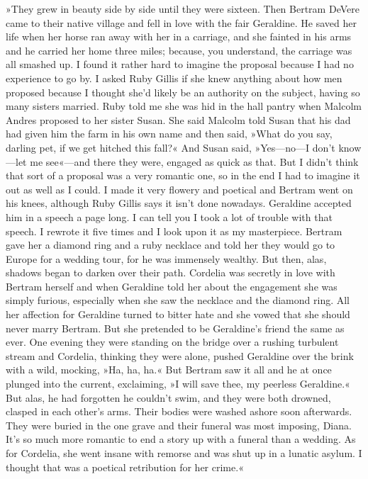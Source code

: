 »They grew in beauty side by side until they were sixteen. Then Bertram DeVere came to their native village and fell in love with the fair Geraldine. He saved her life when her horse ran away with her in a carriage, and she fainted in his arms and he carried her home three miles; because, you understand, the carriage was all smashed up. I found it rather hard to imagine the proposal because I had no experience to go by. I asked Ruby Gillis if she knew anything about how men proposed because I thought she'd likely be an authority on the subject, having so many sisters married. Ruby told me she was hid in the hall pantry when Malcolm Andres proposed to her sister Susan. She said Malcolm told Susan that his dad had given him the farm in his own name and then said, »What do you say, darling pet, if we get hitched this fall?« And Susan said, »Yes—no—I don't know—let me see«—and there they were, engaged as quick as that. But I didn't think that sort of a proposal was a very romantic one, so in the end I had to imagine it out as well as I could. I made it very flowery and poetical and Bertram went on his knees, although Ruby Gillis says it isn't done nowadays. Geraldine accepted him in a speech a page long. I can tell you I took a lot of trouble with that speech. I rewrote it five times and I look upon it as my masterpiece. Bertram gave her a diamond ring and a ruby necklace and told her they would go to Europe for a wedding tour, for he was immensely wealthy. But then, alas, shadows began to darken over their path. Cordelia was secretly in love with Bertram herself and when Geraldine told her about the engagement she was simply furious, especially when she saw the necklace and the diamond ring. All her affection for Geraldine turned to bitter hate and she vowed that she should never marry Bertram. But she pretended to be Geraldine's friend the same as ever. One evening they were standing on the bridge over a rushing turbulent stream and Cordelia, thinking they were alone, pushed Geraldine over the brink with a wild, mocking, »Ha, ha, ha.« But Bertram saw it all and he at once plunged into the current, exclaiming, »I will save thee, my peerless Geraldine.« But alas, he had forgotten he couldn't swim, and they were both drowned, clasped in each other's arms. Their bodies were washed ashore soon afterwards. They were buried in the one grave and their funeral was most imposing, Diana. It's so much more romantic to end a story up with a funeral than a wedding. As for Cordelia, she went insane with remorse and was shut up in a lunatic asylum. I thought that was a poetical retribution for her crime.«

